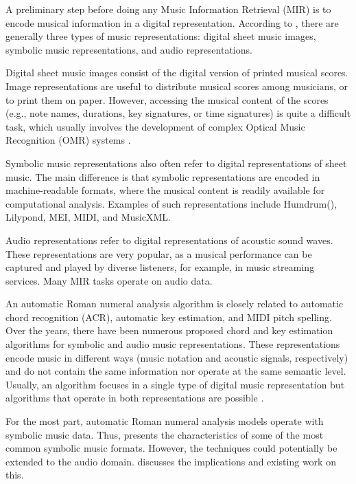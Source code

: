 


A preliminary step before doing any Music Information
Retrieval (MIR) is to encode musical information in a
digital representation. According to
\textcite{muller2015music}, there are generally three types
of music representations: digital sheet music images,
symbolic music representations, and audio representations.

Digital sheet music images consist of the digital version of
printed musical scores. Image representations are useful to
distribute musical scores among musicians, or to print them
on paper. However, accessing the musical content of the
scores (e.g., note names, durations, key signatures, or time
signatures) is quite a difficult task, which usually
involves the development of complex Optical Music
Recognition (OMR) systems
\parencite{calvozaragoza2020understanding}.

Symbolic music representations also often refer to digital
representations of sheet music. The main difference is that
symbolic representations are encoded in machine-readable
formats, where the musical content is readily available for
computational analysis. Examples of such representations
include Humdrum(), Lilypond, MEI, MIDI, and
MusicXML.

Audio representations refer to digital representations of
acoustic sound waves. These representations are very
popular, as a musical performance can be captured and played
by diverse listeners, for example, in music streaming
services. Many MIR tasks operate on audio data.

An automatic Roman numeral analysis algorithm is closely
related to automatic chord recognition (ACR), automatic key
estimation, and MIDI pitch spelling. Over the years, there
have been numerous proposed chord and key estimation
algorithms for symbolic and audio music representations.
These representations encode music in different ways (music
notation and acoustic signals, respectively) and do not
contain the same information nor operate at the same
semantic level. Usually, an algorithm focuses in a single
type of digital music representation but algorithms that
operate in both representations are possible
\parencite{napoleslopez2019keyfinding}.

For the most part, automatic Roman numeral analysis models
operate with symbolic music data. Thus,
 presents the
characteristics of some of the most common symbolic music
formats. However, the techniques could potentially be
extended to the audio domain.
 discusses the
implications and existing work on this.
